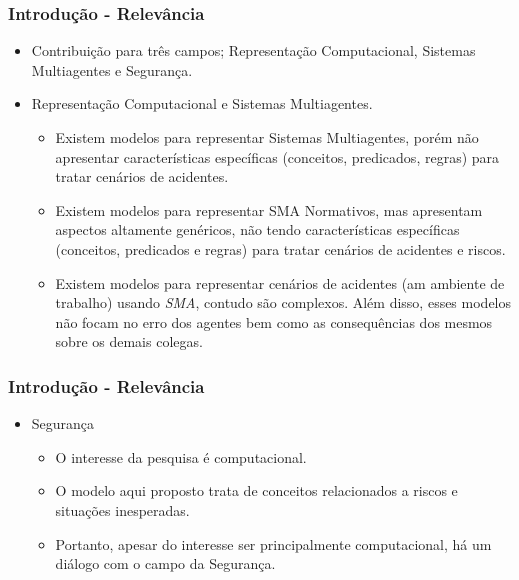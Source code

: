 \documentclass{beamer}
\begin{document}
\begin{frame}
\frametitle{Introdução - Relevância} %
	\begin{itemize}
			\item Contribuição para três campos; Representação Computacional, Sistemas Multiagentes e Segurança.
			\item Representação Computacional e Sistemas Multiagentes.
			\begin{itemize}
				\item Existem modelos para representar Sistemas Multiagentes, porém não apresentar características específicas (conceitos, predicados, regras) para tratar cenários de acidentes. 
				\item Existem modelos para representar SMA Normativos, mas apresentam aspectos altamente genéricos, não tendo características específicas (conceitos, predicados e regras) para tratar cenários de acidentes e riscos.
				\item Existem modelos para representar cenários de acidentes (am ambiente de trabalho) usando \textit{SMA}, contudo são complexos. Além disso, esses modelos não focam no erro dos agentes bem como as consequências dos mesmos sobre os demais colegas.  
			\end{itemize}			 
	\end{itemize}
\end{frame}

\begin{frame}
\frametitle{Introdução - Relevância} %
	\begin{itemize}
			\item Segurança
			\begin{itemize}
				\item O interesse da pesquisa é computacional. 
				\item O modelo aqui proposto trata de conceitos relacionados a riscos e situações inesperadas.
				\item Portanto, apesar do interesse ser principalmente computacional, há um diálogo com o campo da Segurança. 
			\end{itemize}			 
	\end{itemize}
\end{frame}
\end{document}
